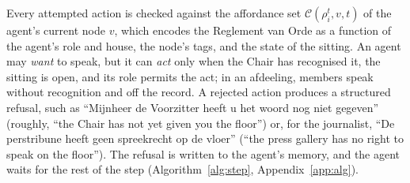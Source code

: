 \documentclass[sigconf,review,anonymous]{acmart}
\begin{document}
Every attempted action is checked against the
affordance set $\mathcal{C}(\rho_i^t,v,t)$ of the agent's current node $v$,
which encodes the Reglement van Orde as a function of the agent's role and
house, the node's tags, and the state of the sitting. An agent may
\emph{want} to speak, but it can \emph{act} only when the Chair has
recognised it, the sitting is open, and its role permits the act; in an
afdeeling, members speak without recognition and off the record. A
rejected action produces a structured refusal, such as ``Mijnheer de
Voorzitter heeft u het woord nog niet gegeven'' (roughly, ``the Chair has
not yet given you the floor'') or, for the journalist, ``De perstribune
heeft geen spreekrecht op de vloer'' (``the press gallery has no right to
speak on the floor''). The refusal is written to the agent's memory, and
the agent waits for the rest of the step (Algorithm~\ref{alg:step},
Appendix~\ref{app:alg}).
\end{document}
